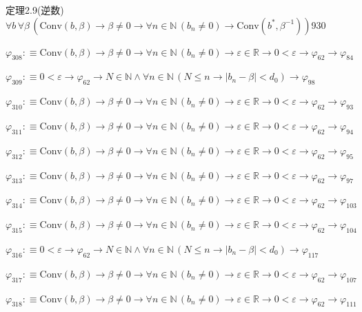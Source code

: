 \begin{fullproof}{定理2.9(逆数)}{$\forall b\,\forall \beta\,(\mathrm{Conv}(b,\beta) \to \beta \neq 0 \to \forall n \in \mathbb{N}\,(b_{n} \neq 0) \to \mathrm{Conv}(b^{\ast},\beta^{-1}))$}{930}
\begin{abbrevlist}
\item $\varphi_{308} :\equiv \mathrm{Conv}(b,\beta) \to \beta \neq 0 \to \forall n \in \mathbb{N}\,(b_{n} \neq 0) \to \varepsilon \in \mathbb{R} \to 0 < \varepsilon \to \varphi_{62} \to \varphi_{84}$
\item $\varphi_{309} :\equiv 0 < \varepsilon \to \varphi_{62} \to N \in \mathbb{N} \land \forall n \in \mathbb{N}\,(N \leq n \to \lvert b_{n} - \beta \rvert < d_{0}) \to \varphi_{98}$
\item $\varphi_{310} :\equiv \mathrm{Conv}(b,\beta) \to \beta \neq 0 \to \forall n \in \mathbb{N}\,(b_{n} \neq 0) \to \varepsilon \in \mathbb{R} \to 0 < \varepsilon \to \varphi_{62} \to \varphi_{93}$
\item $\varphi_{311} :\equiv \mathrm{Conv}(b,\beta) \to \beta \neq 0 \to \forall n \in \mathbb{N}\,(b_{n} \neq 0) \to \varepsilon \in \mathbb{R} \to 0 < \varepsilon \to \varphi_{62} \to \varphi_{94}$
\item $\varphi_{312} :\equiv \mathrm{Conv}(b,\beta) \to \beta \neq 0 \to \forall n \in \mathbb{N}\,(b_{n} \neq 0) \to \varepsilon \in \mathbb{R} \to 0 < \varepsilon \to \varphi_{62} \to \varphi_{95}$
\item $\varphi_{313} :\equiv \mathrm{Conv}(b,\beta) \to \beta \neq 0 \to \forall n \in \mathbb{N}\,(b_{n} \neq 0) \to \varepsilon \in \mathbb{R} \to 0 < \varepsilon \to \varphi_{62} \to \varphi_{97}$
\item $\varphi_{314} :\equiv \mathrm{Conv}(b,\beta) \to \beta \neq 0 \to \forall n \in \mathbb{N}\,(b_{n} \neq 0) \to \varepsilon \in \mathbb{R} \to 0 < \varepsilon \to \varphi_{62} \to \varphi_{103}$
\item $\varphi_{315} :\equiv \mathrm{Conv}(b,\beta) \to \beta \neq 0 \to \forall n \in \mathbb{N}\,(b_{n} \neq 0) \to \varepsilon \in \mathbb{R} \to 0 < \varepsilon \to \varphi_{62} \to \varphi_{104}$
\item $\varphi_{316} :\equiv 0 < \varepsilon \to \varphi_{62} \to N \in \mathbb{N} \land \forall n \in \mathbb{N}\,(N \leq n \to \lvert b_{n} - \beta \rvert < d_{0}) \to \varphi_{117}$
\item $\varphi_{317} :\equiv \mathrm{Conv}(b,\beta) \to \beta \neq 0 \to \forall n \in \mathbb{N}\,(b_{n} \neq 0) \to \varepsilon \in \mathbb{R} \to 0 < \varepsilon \to \varphi_{62} \to \varphi_{107}$
\item $\varphi_{318} :\equiv \mathrm{Conv}(b,\beta) \to \beta \neq 0 \to \forall n \in \mathbb{N}\,(b_{n} \neq 0) \to \varepsilon \in \mathbb{R} \to 0 < \varepsilon \to \varphi_{62} \to \varphi_{111}$

\end{abbrevlist}
\end{fullproof}
